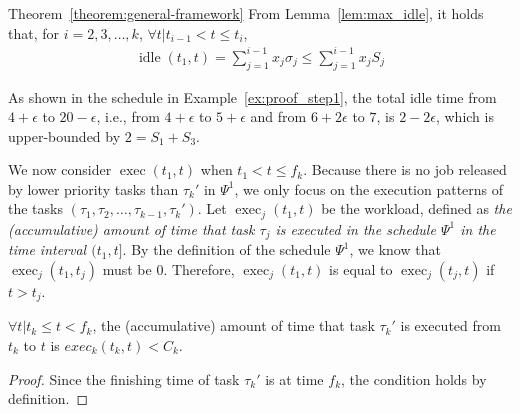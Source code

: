 \begin{appProof}{Theorem~\ref{theorem:general-framework}}
From Lemma~\ref{lem:max_idle}, it holds that, for $i=2,3,\ldots,k$, $\forall t | t_{i-1} < t \leq t_i$, 
\begin{align}
\label{eq:sumof-sigma}
\operatorname{idle}(t_1, t) = \sum_{j=1}^{i-1} x_j \sigma_j \leq
  \sum_{j=1}^{i-1} x_j S_j
\end{align}

As shown in the schedule in Example~\ref{ex:proof_step1}, the total idle time from $4+\epsilon$ to
$20-\epsilon$, i.e., from $4+\epsilon$ to $5+\epsilon$ and from
$6+2\epsilon$ to $7$, is $2-2\epsilon$, which is upper-bounded by $2 =
S_1+S_3$. 


%


We now consider $\operatorname{exec}(t_1, t)$ when $t_1 < t \leq f_k$.
Because there is no job released by lower priority tasks than
$\tau_k'$ in $\Psi^1$, we only focus on the execution patterns of the
tasks $(\tau_1, \tau_2, \ldots, \tau_{k-1}, \tau_k')$. Let
$\operatorname{exec}_j(t_1, t)$ be the workload, defined as \emph{the
 (accumulative) amount of time that task $\tau_j$ is executed in the schedule
  $\Psi^1$ in the time interval $(t_1, t]$}. By the definition of the
schedule $\Psi^1$, we know that $\operatorname{exec}_j(t_1, t_j)$ must
be $0$. Therefore, $\operatorname{exec}_j(t_1, t)$ is equal to
$\operatorname{exec}_j(t_j, t)$ if $t > t_j$.

\begin{Lemma}
  \label{lemma:exec-tau-k}
  $\forall t | t_k \leq t < f_k$, the (accumulative) amount of time that
  task $\tau_k'$ is executed from $t_k$ to $t$ is $exec_k(t_k, t) <
  C_k$.
\end{Lemma}
\begin{proof}
  Since the finishing time of task $\tau_k'$ is at time $f_k$, the
  condition holds by definition.
\end{proof}


\end{appProof}
